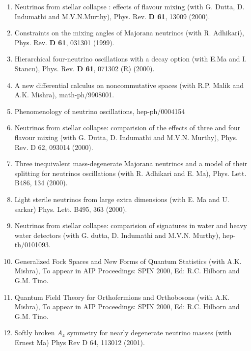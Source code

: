 \begin{enumerate}
\item Neutrinos from stellar collapse : effects of flavour mixing (with
G. Dutta, D. Indumathi and M.V.N.Murthy), Phys. Rev. {\bf D 61}, 13009
(2000).

\item Constraints on the mixing angles of Majorana neutrinos (with R.
Adhikari), Phys. Rev. {\bf D 61}, 031301 (1999). 

\item Hierarchical four-neutrino oscillations with a decay option (with
E.Ma and I. Stancu), Phys. Rev. {\bf D 61}, 071302 (R) (2000).

\item A new differential calculus on noncommutative spaces (with R.P.
Malik and A.K. Mishra), math-ph/9908001.

\item Phenomenology of neutrino oscillations, hep-ph/0004154

\item Neutrinos from stellar collapse: comparision of the effects of three and four flavour mixing (with G. Dutta, D. Indumathi and M.V.N. Murthy), Phys. Rev. D 62, 093014 (2000).

\item Three inequivalent mass-degenerate Majorana neutrinos and a model of their splitting for neutrinos oscillations (with R. Adhikari and E. Ma), Phys. Lett. B486, 134 (2000).

\item Light sterile neutrinos from large extra dimensions (with E. Ma and U. sarkar) Phys. Lett. B495, 363 (2000).

\item Neutrinos from stellar collapse: comparision of signatures in water and heavy water detectors (with G. dutta, D. Indumathi and M.V.N. Murthy), hep-th/0101093.

\item Generalized Fock Spaces and New Forms of Quantum Statistics (with A.K. Mishra), To appear in AIP Proceedings: SPIN 2000, Ed: R.C. Hilborn and G.M. Tino.

\item Quantum Field Theory for Orthofermions and Orthobosons (with A.K. Mishra), To appear in AIP Proceedings: SPIN 2000, Ed: R.C. Hilborn and G.M. Tino.

\item Softly broken $A_4$ symmetry for nearly degenerate neutrino masses (with Ernest Ma) Phys Rev D 64, 113012 (2001).


\end{enumerate}
